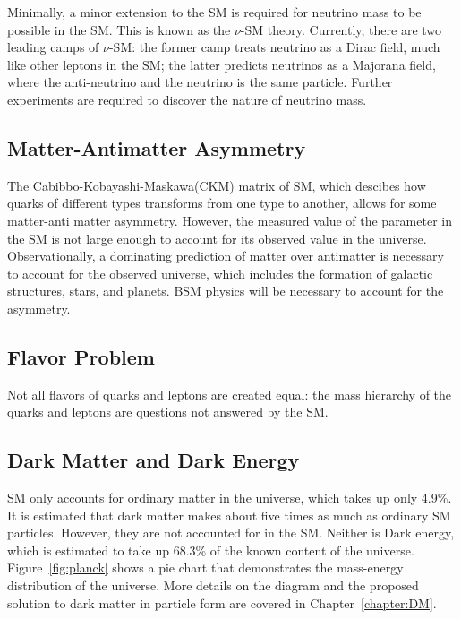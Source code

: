 Minimally, a minor extension to the SM is required for neutrino mass to be possible in the SM. This is known as the $\nu$-SM theory. Currently, there are two leading camps of $\nu$-SM: the former camp treats neutrino as a Dirac field, much like other leptons in the SM; the latter predicts neutrinos as a Majorana field, where the anti-neutrino and the neutrino is the same particle. Further experiments are required to discover the nature of neutrino mass. 



\subsection{Matter-Antimatter Asymmetry}
The Cabibbo-Kobayashi-Maskawa(CKM) matrix of SM, which descibes how quarks of different types transforms from one type to another, allows for some matter-anti matter asymmetry. However, the measured value of the parameter in the SM is not large enough to account for its observed value in the universe. Observationally, a dominating prediction of matter over antimatter is necessary to account for the observed universe, which includes the formation of galactic structures, stars, and planets. BSM physics will be necessary to account for the asymmetry. 

\subsection{Flavor Problem}
Not all flavors of quarks and leptons are created equal: the mass hierarchy of the quarks and leptons are questions not answered by the SM.

\subsection{Dark Matter and Dark Energy}
SM only accounts for ordinary matter in the universe, which takes up only 4.9\%. It is estimated that dark matter makes about five times as much as ordinary SM particles. However, they are not accounted for in the SM.
Neither is Dark energy, which is estimated to take up 68.3\% of the known content of the universe. Figure~\ref{fig:planck} shows a pie chart that demonstrates the mass-energy distribution of the universe. More details on the diagram and the proposed solution to dark matter in particle form are covered in Chapter~\ref{chapter:DM}.

